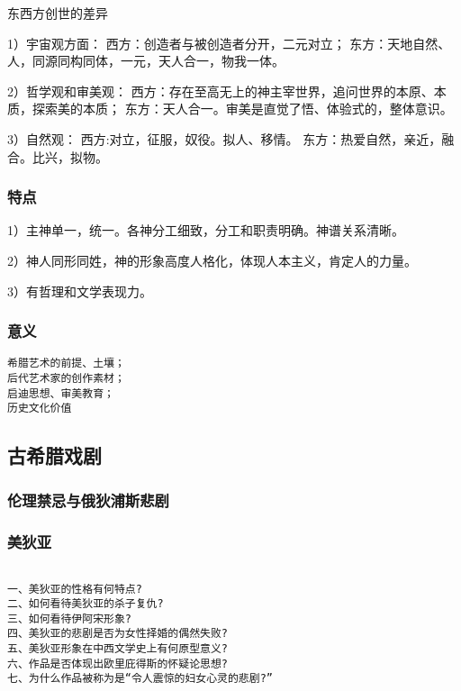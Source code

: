 \documentclass[UTF8]{../RepresentationUniverse}
\begin{document}
\begin{proposition}
    东西方创世的差异

    1）宇宙观方面：
    西方：创造者与被创造者分开，二元对立；
    东方：天地自然、人，同源同构同体，一元，天人合一，物我一体。

    2）哲学观和审美观：
    西方：存在至高无上的神主宰世界，追问世界的本原、本质，探索美的本质；
    东方：天人合一。审美是直觉了悟、体验式的，整体意识。

    3）自然观：
    西方:对立，征服，奴役。拟人、移情。
    东方：热爱自然，亲近，融合。比兴，拟物。
\end{proposition}




\subsubsection{特点}
1）主神单一，统一。各神分工细致，分工和职责明确。神谱关系清晰。

2）神人同形同姓，神的形象高度人格化，体现人本主义，肯定人的力量。

3）有哲理和文学表现力。


\subsubsection{意义}

\begin{lstlisting}
希腊艺术的前提、土壤；
后代艺术家的创作素材；
启迪思想、审美教育；
历史文化价值
\end{lstlisting}


\subsection{古希腊戏剧}

\subsubsection{伦理禁忌与俄狄浦斯悲剧}

\subsubsection{美狄亚}

\begin{lstlisting}

一、美狄亚的性格有何特点?
二、如何看待美狄亚的杀子复仇?
三、如何看待伊阿宋形象?
四、美狄亚的悲剧是否为女性择婚的偶然失败?
五、美狄亚形象在中西文学史上有何原型意义?
六、作品是否体现出欧里庇得斯的怀疑论思想?
七、为什么作品被称为是“令人震惊的妇女心灵的悲剧?”

\end{lstlisting}
\end{document}
